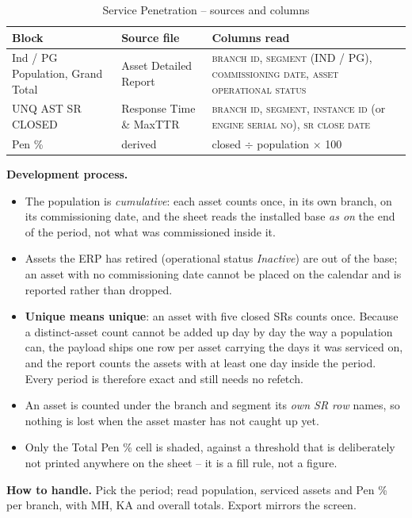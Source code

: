 \documentclass[11pt,a4paper]{article}
\newcommand{\devproc}{\textbf{Development process.}\par}
\newcommand{\handle}[1]{\textbf{How to handle.} #1\par}
\newcommand{\col}[1]{\textsc{\small #1}}
\begin{document}
\begin{table}[H]\centering\small
\begin{tabularx}{\linewidth}{@{}p{3.3cm}p{3.4cm}X@{}}
\toprule
\textbf{Block} & \textbf{Source file} & \textbf{Columns read} \\
\midrule
Ind / PG Population, Grand Total & Asset Detailed Report &
\col{branch id}, \col{segment} (IND / PG), \col{commissioning date},
\col{asset operational status} \\
UNQ AST SR CLOSED & Response Time \& MaxTTR &
\col{branch id}, \col{segment}, \col{instance id} (or \col{engine serial no}),
\col{sr close date} \\
Pen \% & derived & closed $\div$ population $\times$ 100 \\
\bottomrule
\end{tabularx}
\caption{Service Penetration -- sources and columns}
\end{table}

\devproc
\begin{itemize}
  \item The population is \emph{cumulative}: each asset counts once, in its own branch, on
  its commissioning date, and the sheet reads the installed base \emph{as on} the end of
  the period, not what was commissioned inside it.
  \item Assets the ERP has retired (operational status \emph{Inactive}) are out of the
  base; an asset with no commissioning date cannot be placed on the calendar and is
  reported rather than dropped.
  \item \textbf{Unique means unique}: an asset with five closed SRs counts once. Because a
  distinct-asset count cannot be added up day by day the way a population can, the payload
  ships one row per asset carrying the days it was serviced on, and the report counts the
  assets with at least one day inside the period. Every period is therefore exact and
  still needs no refetch.
  \item An asset is counted under the branch and segment its \emph{own SR row} names, so
  nothing is lost when the asset master has not caught up yet.
  \item Only the Total Pen \% cell is shaded, against a threshold that is deliberately not
  printed anywhere on the sheet -- it is a fill rule, not a figure.
\end{itemize}

\handle{Pick the period; read population, serviced assets and Pen \% per branch, with MH,
KA and overall totals. Export mirrors the screen.}
\end{document}
